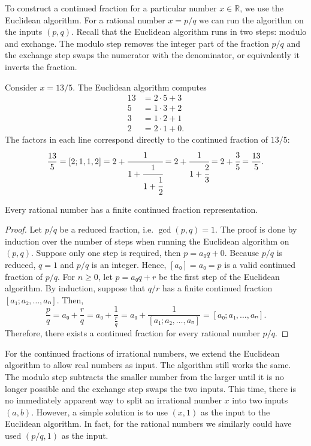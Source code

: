 To construct a continued fraction for a particular number $x ∈ ℝ$,
we use the Euclidean algorithm.
For a rational number $x = p/q$ we can run the algorithm
on the inputs $(p, q)$.
Recall that the Euclidean algorithm runs in two steps: modulo and exchange.
The modulo step removes the integer part of the fraction $p/q$
and the exchange step swaps the numerator with the denominator,
or equivalently it inverts the fraction.

\begin{example}
  Consider $x = 13/5$.
  The Euclidean algorithm computes
  \begin{align*}
    13 & = 2 · 5 + 3 \\
     5 & = 1 · 3 + 2 \\
     3 & = 1 · 2 + 1 \\
     2 & = 2 · 1 + 0.
  \end{align*}
  The factors in each line correspond directly to the continued fraction of $13/5$:
  \[
    \frac{13}{5}
    = [2; 1, 1, 2]
    = 2 + \cfrac{1}{1 + \cfrac{1}{1 + \cfrac{1}{2}}}
    = 2 + \cfrac{1}{1 + \cfrac{2}{3}}
    = 2 + \cfrac{3}{5}
    = \frac{13}{5}.
  \]
\end{example}

\begin{theorem}
  \label{thm:rat-cf}
  Every rational number has a finite continued fraction representation.
\end{theorem}

\begin{proof}
  Let $p/q$ be a reduced fraction, i.e. $\gcd(p, q) = 1$.
  The proof is done by induction over the number of steps when running the
  Euclidean algorithm on $(p, q)$.
  Suppose only one step is required, then $p = a₀ q + 0$.
  Because $p/q$ is reduced, $q = 1$ and $p/q$ is an integer.
  Hence, $[a₀] = a₀ = p$ is a valid continued fraction of $p/q$.
  For $n ≥ 0$, let $p = a₀ q + r$ be the first step of the Euclidean algorithm.
  By induction, suppose that $q/r$ has a finite continued fraction $[a₁; a₂, …, aₙ]$.
  Then,
  \[
    \frac{p}{q}
    = a₀ + \frac{r}{q}
    = a₀ + \frac{1}{\frac{r}{q}}
    = a₀ + \frac{1}{[a₁; a₂, …, aₙ]}
    = [a₀; a₁, …, aₙ].
  \]
  Therefore, there exists a continued fraction for every rational number $p/q$.
\end{proof}

For the continued fractions of irrational numbers,
we extend the Euclidean algorithm to allow real numbers as input.
The algorithm still works the same.
The modulo step subtracts the smaller number from the larger until it is no
longer possible and the exchange step swaps the two inputs.
This time, there is no immediately apparent way to split an irrational number
$x$ into two inputs $(a, b)$.
However, a simple solution is to use $(x, 1)$ as the input to the Euclidean
algorithm.
In fact, for the rational numbers we similarly could have used $(p/q, 1)$ as
the input.

